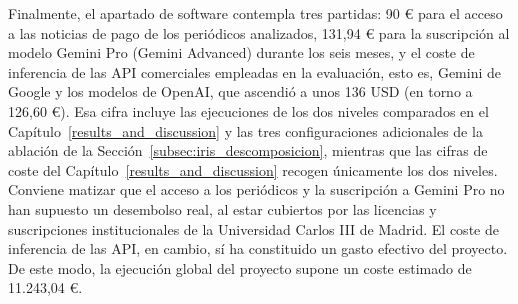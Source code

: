 Finalmente, el apartado de software contempla tres partidas: 90 € para el acceso a las noticias de pago de los periódicos analizados, 131,94 € para la suscripción al modelo Gemini Pro (Gemini Advanced) durante los seis meses, y el coste de inferencia de las API comerciales empleadas en la evaluación, esto es, Gemini de Google y los modelos de OpenAI, que ascendió a unos 136 USD (en torno a 126,60 €). Esa cifra incluye las ejecuciones de los dos niveles comparados en el Capítulo~\ref{results_and_discussion} y las tres configuraciones adicionales de la ablación de la Sección~\ref{subsec:iris_descomposicion}, mientras que las cifras de coste del Capítulo~\ref{results_and_discussion} recogen únicamente los dos niveles. Conviene matizar que el acceso a los periódicos y la suscripción a Gemini Pro no han supuesto un desembolso real, al estar cubiertos por las licencias y suscripciones institucionales de la Universidad Carlos III de Madrid. El coste de inferencia de las API, en cambio, sí ha constituido un gasto efectivo del proyecto. De este modo, la ejecución global del proyecto supone un coste estimado de 11.243,04 €.




